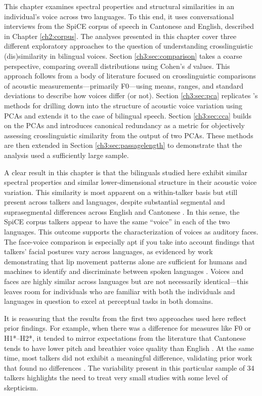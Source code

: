 This chapter examines spectral properties and structural similarities in an individual's voice across two languages. To this end, it uses conversational interviews from the SpiCE corpus of speech in Cantonese and English, described in Chapter \ref{ch2:corpus}. The analyses presented in this chapter cover three different exploratory approaches to the question of understanding crosslinguistic (dis)similarity in bilingual voices. Section \ref{ch3:sec:comparison} takes a coarse perspective, comparing overall distributions using Cohen's \textit{d} values. This approach follows from a body of literature focused on crosslinguistic comparisons of acoustic measurements---primarily F0---using means, ranges, and standard deviations to describe how voices differ (or not). Section \ref{ch3:sec:pca} replicates \citeauthor{lee_2019_acoustic}'s \citeyearpar{lee_2019_acoustic} methods for drilling down into the structure of acoustic voice variation using PCAs and extends it to the case of bilingual speech. Section \ref{ch3:sec:cca} builds on the PCAs and introduces canonical redundancy as a metric for objectively assessing crosslinguistic similarity from the output of two PCAs. These methods are then extended in Section \ref{ch3:sec:passagelength} to demonstrate that the analysis used a sufficiently large sample.

A clear result in this chapter is that the bilinguals studied here exhibit similar spectral properties and similar lower-dimensional structure in their acoustic voice variation. This similarity is most apparent on a within-talker basis but still present across talkers and languages, despite substantial segmental and suprasegmental differences across English and Cantonese \citep{matthews_2013_cantonese, wilson_2011_language}. In this sense, the SpiCE corpus talkers appear to have the same ``voice'' in each of the two languages. This outcome supports the characterization of voices as auditory faces. The face-voice comparison is especially apt if you take into account findings that talkers' facial postures vary across languages, as evidenced by work demonstrating that lip movement patterns alone are sufficient for humans and machines to identify and discriminate between spoken languages \citep{afouras_2020_now, sotofaraco_2007_discriminating}. Voices and faces are highly similar across languages but are not necessarily identical---this leaves room for individuals who are familiar with both the individuals and languages in question to excel at perceptual tasks in both domains.

It is reassuring that the results from the first two approaches used here reflect prior findings. For example, when there was a difference for measures like F0 or H1*--H2*, it tended to mirror expectations from the literature that Cantonese tends to have lower pitch and breathier voice quality than English \citep{ng_2012_ltas, ng_2010_voice}. At the same time, most talkers did not exhibit a meaningful difference, validating prior work that found no differences \citep{altenberg_2006_f0}. The variability present in this particular sample of 34 talkers highlights the need to treat very small studies with some level of skepticism.

